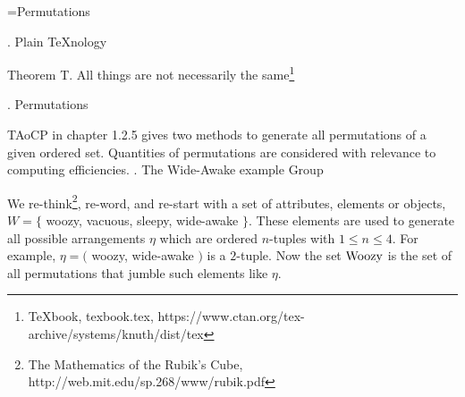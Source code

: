 
\def\a{\left(\matrix }
\def\b{\cr}
\def\c{\right)}

\def\d{\footnote*{The Mathematics of the Rubik’s Cube,
  http://web.mit.edu/sp.268/www/rubik.pdf}}
\def\f{\footnote*{TAoCP chapter 1.2.5,
  https://www-cs-faculty.stanford.edu/\%7Eknuth/taocp.html}}
\def\g{\footnote*{\TeX book, texbook.tex,
  https://www.ctan.org/tex-archive/systems/knuth/dist/tex}}
\def\gg{\footnote*{https://books.google.co.uk/books?id=\%5fn1vr0\%5fRbXoC\&lpg=PA786\&pg=PA786}}
%
\def\dd{\footnote*{https://github.com/the-number/R/blob/explore/0003/looks-like/explore/a/p/6/in-pictures.org}}
\def\e{\bigskip}
\def\R{\hbox{Woozy}}
\def\*{\circ}
%
\vsize=300pt %
\hsize=480pt %

\footline={\tenrm Permutations\quad\dotfill\quad \folio}
\raggedright

. Plain \TeX nology %

\proclaim Theorem T. All things are not necessarily the same\g

\def\strutdepth{\dp\strutbox}
\def\marginalstar{\strut\vadjust{\kern-\strutdepth\specialstar}}
\def\specialstar{\vtop to \strutdepth{
  \baselineskip\strutdepth
  \vss\llap{* }\null}}

. Permutations

\e
TAoCP in chapter 1.2.5 gives two methods to generate
all permutations of a given ordered set.
Quantities of permutations are considered
with relevance to computing efficiencies.
. The Wide-Awake example Group

\e
We re-think\d, re-word, and re-start
with a set of attributes, elements or objects,\break
$W=\{$ woozy, vacuous, sleepy, wide-awake $\}.$
These elements are used to generate all possible
arrangements $\eta$ which are ordered $n$-tuples with
$1\le n\le4.$
For example, $\eta=($ woozy, wide-awake $)$ is a $2$-tuple.
Now the set $\R$ is the set of all permutations that jumble
such elements like $\eta.$

